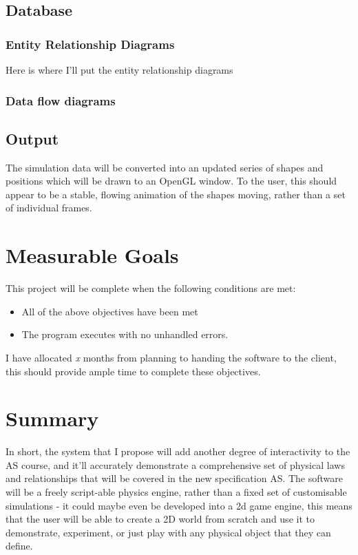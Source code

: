 \subsection{Database}

\subsubsection{Entity Relationship Diagrams}
	Here is where I'll put the entity relationship diagrams

\subsubsection{Data flow diagrams}


\subsection{Output}
	The simulation data will be  converted into an updated series of shapes and positions which will be drawn to an OpenGL window. To the user, this should appear to be a stable, flowing animation of the shapes moving, rather than a set of individual frames.
	
\section{Measurable Goals}
	This project will be complete when the following conditions are met:
	\begin{itemize}
		\item All of the above objectives have been met
		\item The program executes with no unhandled errors.
	\end{itemize}
	I have allocated \textit{x} months from planning to handing the software to the client, this should provide ample time to complete these objectives.
	




\section{Summary}
In short, the system that I propose will add another degree of interactivity to the AS course, and it'll accurately demonstrate a comprehensive set of physical laws and relationships that will be covered in the new specification AS. The software will be a freely script-able physics engine, rather than a fixed set of customisable simulations - it could maybe even be developed into a 2d game engine, this means that the user will be able to create a 2D world from scratch and use it to demonstrate, experiment, or just play with any physical object that they can define.
